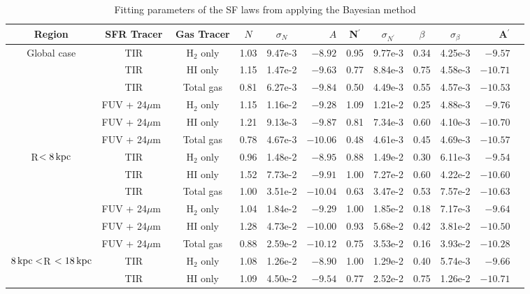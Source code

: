 \documentclass[useAMS,usenatbib]{mn2e}
\newcommand \kpc        {\,{\rm kpc}}
\newcommand \um    {$\mu$m\ }
\newcommand \nprime {N$^\prime$}
\newcommand \eqnprime {N^\prime}
\begin{document}
\begin{table*}
\caption{Fitting parameters of the SF laws from applying the Bayesian method}
\label{table:res}
\begin{tabular}{cccccrccccrr}
\hline\hline
\multicolumn{1}{c}{\multirow{1}{*}{Region}} & SFR Tracer& Gas Tracer & $N$ & $\sigma_N$ & $A$ & \nprime & $\sigma_{\eqnprime}$ & $\beta$ & $\sigma_\beta$ & A$^\prime$& \\
\hline
\multicolumn{1}{c}{\multirow{6}{*}{Global case}} & TIR & H$_2$ only & 1.03 & 9.47e-3  & $-8.92$  & 0.95 & 9.77e-3 & 0.34 & 4.25e-3 & $-9.57$  \\
 & TIR         & HI only    & 1.15 & 1.47e-2 & $-9.63$  & 0.77 & 8.84e-3 & 0.75 & 4.58e-3 & $-10.71$ \\
 & TIR         & Total gas  & 0.81 & 6.27e-3 & $-9.84$  & 0.50 & 4.49e-3 & 0.55 & 4.57e-3 & $-10.53$\\
 & FUV + 24\um & H$_2$ only & 1.15 & 1.16e-2 & $-9.28$  & 1.09 & 1.21e-2 & 0.25 & 4.88e-3 & $-9.76$  \\
 & FUV + 24\um & HI only    & 1.21 & 9.13e-3 & $-9.87$  & 0.81 & 7.34e-3 & 0.60 & 4.10e-3 & $-10.70$ \\
 & FUV + 24\um & Total gas  & 0.78 & 4.67e-3 & $-10.06$ & 0.48 & 4.61e-3 & 0.45 & 4.69e-3 & $-10.57$ \\
\hline
\multicolumn{1}{c}{\multirow{6}{*}{R$< 8\kpc$}}& TIR & H$_2$ only & 0.96 & 1.48e-2 & $-8.95$  & 0.88 & 1.49e-2 & 0.30 & 6.11e-3 & $-9.54$  \\
 & TIR         & HI only    & 1.52 & 7.73e-2  & $-9.91$ & 1.00 & 7.27e-2  & 0.60 & 4.22e-2  & $-10.60$ \\
 & TIR         & Total gas  & 1.00 & 3.51e-2  & $-10.04$ & 0.63 & 3.47e-2  & 0.53 & 7.57e-2  & $-10.63$ \\
 & FUV + 24\um & H$_2$ only & 1.04 & 1.84e-2 & $-9.29$  & 1.00 & 1.85e-2 & 0.18 & 7.17e-3 & $-9.64$  \\
 & FUV + 24\um & HI only    & 1.28 & 4.73e-2  & $-10.00$ & 0.93 & 5.68e-2  & 0.42 & 3.81e-2  & $-10.50$ \\
 & FUV + 24\um & Total gas  & 0.88 & 2.59e-2  & $-10.12$ & 0.75 & 3.53e-2  & 0.16 & 3.93e-2  & $-10.28$ \\
\hline
\multicolumn{1}{c}{\multirow{6}{*}{$8\kpc < $R $< 18\kpc$}} & TIR & H$_2$ only & 1.08 & 1.26e-2 & $-8.90$  & 1.00 & 1.29e-2 & 0.40 & 5.74e-3 & $-9.66$  \\
 & TIR         & HI only    & 1.09 & 4.50e-2 & $-9.54$  & 0.77 & 2.52e-2  & 0.75 & 1.26e-2  & $-10.71$ \\

\end{tabular}
\end{table*}
\end{document}
